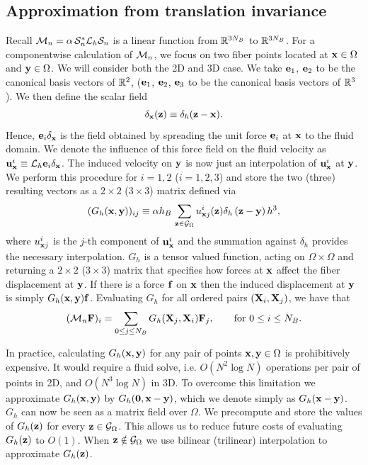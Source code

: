 \subsection{Approximation from translation invariance}
Recall $\mathcal{M}_n =  \alpha \, \mathcal{S}^*_n \mathcal{L}_h \mathcal{S}_n$ is a linear function from $\mathbb{R}^{3N_B}$ to $\mathbb{R}^{3N_B}$. For a componentwise calculation of $\mathcal{M}_n$, we focus on two fiber points located at $\mathbf{x}\in\Omega$ and $\mathbf{y}\in\Omega$. We will consider both the 2D and 3D case. We take $\mathbf{e}_1$, $\mathbf{e}_2$ to be the canonical basis vectors of $\mathbb{R}^2$, ($\mathbf{e}_1$, $\mathbf{e}_2$, $\mathbf{e}_3$ to be the canonical basis vectors of $\mathbb{R}^3$). We then define the scalar field
\begin{equation}
\delta_{\mathbf{x}}(\mathbf{z}) \equiv \delta_h(\mathbf{z} - \mathbf{x}).
\end{equation}
Hence, $\mathbf{e}_i\delta_{\mathbf{x}}$ is the  field obtained by spreading the unit force $\mathbf{e}_i$ at $\mathbf{x}$ to the fluid domain.
We denote the influence of this force field on the fluid velocity as $\mathbf{u}_{\mathbf{x}}^i \equiv \mathcal{L}_h \mathbf{e}_i \delta_{\mathbf{x}}$. The induced velocity on $\mathbf{y}$ is now just an interpolation of $\mathbf{u}_{\mathbf{x}}^i$ at $\mathbf{y}$. 
We perform this procedure for $i=1,2$ ($i=1,2,3$) and store the two (three) resulting vectors as a $2\times 2$ ($3\times 3$) matrix defined via
\begin{equation}
(G_h(\mathbf{x},\mathbf{y}))_{ij} \equiv \alpha h_B \, \sum_{\mathbf{z} \in \mathcal{G}_\Omega} u_{\mathbf{x}j}^i(\mathbf{z}) \delta_h\left(\mathbf{z}-\mathbf{y}\right)h^3,
\label{meq:GreensDef}
\end{equation}
where $u_{\mathbf{x}j}^i$ is the $j$-th component of $\mathbf{u}_{\mathbf{x}}^i$ and
the summation against $\delta_h$ provides the necessary interpolation.
$G_h$ is a tensor valued function, acting on $\Omega\times\Omega$ and returning a $2\times 2$ ($3\times 3$) matrix that specifies how forces at $\mathbf{x}$ affect the fiber displacement at $\mathbf{y}$. If there is a force $\mathbf{f}$ on $\mathbf{x}$ then the induced displacement at $\mathbf{y}$ is simply $G_h(\mathbf{x},\mathbf{y})\mathbf{f}$. Evaluating $G_h$ for all ordered pairs $\left(\mathbf{X}_i,\mathbf{X}_j\right)$, we have that
\begin{equation}
(\mathcal{M}_n\mathbf{F})_i = \sum_{0\leq j\leq N_B} G_h(\mathbf{X}_j, \mathbf{X}_i) \mathbf{F}_j, \qquad\text{for $0\leq i\leq N_B$}.
\end{equation}

In practice, calculating $G_h(\mathbf{x},\mathbf{y})$ for any pair of points $\mathbf{x},\mathbf{y}\in\Omega$ is prohibitively expensive. It would require a fluid solve, i.e. $O(N^2\log N)$ operations per pair of points in 2D, and $O(N^3\log N)$ in 3D. To overcome this limitation we approximate $G_h(\mathbf{x},\mathbf{y})$ by $G_h(\mathbf{0}, \mathbf{x}-\mathbf{y})$, which we denote simply as $G_h(\mathbf{x}-\mathbf{y})$.
$G_h$ can now be seen as a matrix field over $\Omega$. We precompute and store the values of $G_h(\mathbf{z})$ for every $\mathbf{z}\in\mathcal{G}_\Omega$. This allows us to reduce future costs of evaluating $G_h(\mathbf{z})$ to $O(1)$. When $\mathbf{z}\notin\mathcal{G}_\Omega$ we use bilinear (trilinear) interpolation to approximate $G_h(\mathbf{z})$.

